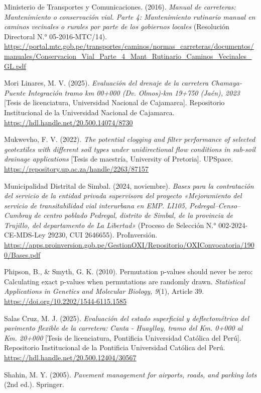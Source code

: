 \begin{list}{}
\item Ministerio de Transportes y Comunicaciones. (2016). \textit{Manual de carreteras: Mantenimiento o conservación vial. Parte 4: Mantenimiento rutinario manual en caminos vecinales o rurales por parte de los gobiernos locales} (Resolución Directoral N.° 05-2016-MTC/14). \url{https://portal.mtc.gob.pe/transportes/caminos/normas_carreteras/documentos/manuales/Conservacion_Vial_Parte_4_Mant_Rutinario_Caminos_Vecinales_GL.pdf}
\item Mori Linares, M. V. (2025). \textit{Evaluación del drenaje de la carretera Chamaya-Puente Integración tramo km 00+000 (Dv. Olmos)-km 19+750 (Jaén), 2023} [Tesis de licenciatura, Universidad Nacional de Cajamarca]. Repositorio Institucional de la Universidad Nacional de Cajamarca. \url{https://hdl.handle.net/20.500.14074/8730}
\item Mukwevho, F. V. (2022). \textit{The potential clogging and filter performance of selected geotextiles with different soil types under unidirectional flow conditions in sub-soil drainage applications} [Tesis de maestría, University of Pretoria]. UPSpace. \url{https://repository.up.ac.za/handle/2263/87157}
\item Municipalidad Distrital de Simbal. (2024, noviembre). \textit{Bases para la contratación del servicio de la entidad privada supervisora del proyecto «Mejoramiento del servicio de transitabilidad vial interurbana en EMP. LI105, Pedregal–Censo–Cumbray de centro poblado Pedregal, distrito de Simbal, de la provincia de Trujillo, del departamento de La Libertad»} (Proceso de Selección N.° 002-2024-CE-MDS-Ley 29230, CUI 2646655). ProInversión. \url{https://apps.proinversion.gob.pe/GestionOXI/Repositorio/OXIConvocatoria/1900/Bases.pdf}
\item Phipson, B., \& Smyth, G. K. (2010). Permutation p-values should never be zero: Calculating exact p-values when permutations are randomly drawn. \textit{Statistical Applications in Genetics and Molecular Biology, 9}(1), Article 39. \url{https://doi.org/10.2202/1544-6115.1585}
\item Salas Cruz, M. J. (2025). \textit{Evaluación del estado superficial y deflectométrico del pavimento flexible de la carretera: Canta - Huayllay, tramo del Km. 0+000 al Km. 20+000} [Tesis de licenciatura, Pontificia Universidad Católica del Perú]. Repositorio Institucional de la Pontificia Universidad Católica del Perú. \url{https://hdl.handle.net/20.500.12404/30567}
\item Shahin, M. Y. (2005). \textit{Pavement management for airports, roads, and parking lots} (2nd ed.). Springer.

\end{list}
